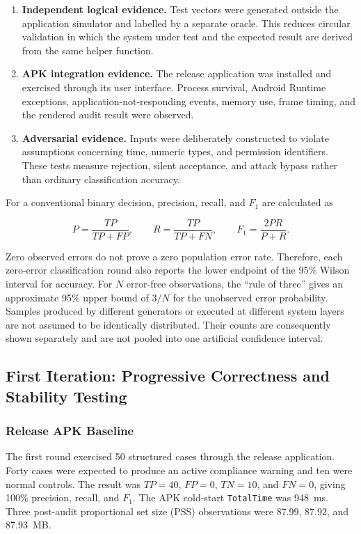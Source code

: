 \begin{enumerate}
    \item \textbf{Independent logical evidence.} Test vectors were generated outside the application simulator and labelled by a separate oracle. This reduces circular validation in which the system under test and the expected result are derived from the same helper function.
    \item \textbf{APK integration evidence.} The release application was installed and exercised through its user interface. Process survival, Android Runtime exceptions, application-not-responding events, memory use, frame timing, and the rendered audit result were observed.
    \item \textbf{Adversarial evidence.} Inputs were deliberately constructed to violate assumptions concerning time, numeric types, and permission identifiers. These tests measure rejection, silent acceptance, and attack bypass rather than ordinary classification accuracy.
\end{enumerate}

For a conventional binary decision, precision, recall, and \(F_1\) are calculated as

\begin{equation}
P=\frac{TP}{TP+FP}, \qquad
R=\frac{TP}{TP+FN}, \qquad
F_1=\frac{2PR}{P+R}.
\end{equation}

Zero observed errors do not prove a zero population error rate. Therefore, each zero-error classification round also reports the lower endpoint of the 95\% Wilson interval for accuracy. For \(N\) error-free observations, the ``rule of three'' gives an approximate 95\% upper bound of \(3/N\) for the unobserved error probability. Samples produced by different generators or executed at different system layers are not assumed to be identically distributed. Their counts are consequently shown separately and are not pooled into one artificial confidence interval.

\subsection{First Iteration: Progressive Correctness and Stability Testing}

\subsubsection{Release APK Baseline}

The first round exercised 50 structured cases through the release application. Forty cases were expected to produce an active compliance warning and ten were normal controls. The result was \(TP=40\), \(FP=0\), \(TN=10\), and \(FN=0\), giving 100\% precision, recall, and \(F_1\). The APK cold-start \texttt{TotalTime} was 948~ms. Three post-audit proportional set size (PSS) observations were 87.99, 87.92, and 87.93~MB.

